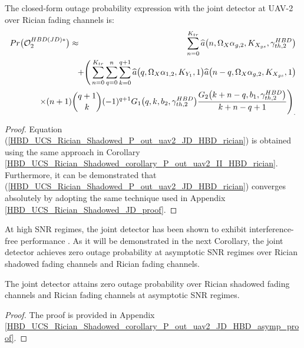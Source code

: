 \begin{corollary} \label{HBD_UCS_Rician_Shadowed_corollary_P_out_uav2_JD_HBD_rician}
The closed-form outage probability expression with the joint detector at UAV-2 over Rician fading channels is:
\begin{eqnarray} \label{HBD_UCS_Rician_Shadowed_P_out_uav2_JD_HBD_rician}
 Pr\big(\mathcal{O}_{2}^{HBD(JD)*}\big) & \approx & \sum_{n=0}^{K_{tr}} \widehat{a}\big(n,\Omega_X\alpha_{g,2},K_{X_{gs}},\gamma_{th,2}^{HBD}\big) \nonumber\\
 & & \hspace{-2cm} + \Bigg( \sum_{n=0}^{K_{tr}}\sum_{q=0}^{n}\sum_{k=0}^{q+1} \widehat{a}\big(q,\Omega_X\alpha_{1,2},K_{Y_1},1\big) \widehat{a}\big(n-q,\Omega_X\alpha_{g,2},K_{X_{gs}},1\big) \nonumber\\
 & & \hspace{-2cm} \times (n+1) \binom{q+1}{k}(-1)^{q+1} G_1\big(q,k,b_2,\gamma_{th,2}^{HBD}\big) \frac{G_2\big(k+n-q,b_1,\gamma_{th,2}^{HBD}\big)}{k+n-q+1}\Bigg)_.
\end{eqnarray}
\end{corollary}
\begin{proof}
Equation (\ref{HBD_UCS_Rician_Shadowed_P_out_uav2_JD_HBD_rician}) is obtained using the same approach in Corollary \ref{HBD_UCS_Rician_Shadowed_corollary_P_out_uav2_II_HBD_rician}. Furthermore, it can be demonstrated that (\ref{HBD_UCS_Rician_Shadowed_P_out_uav2_JD_HBD_rician}) converges absolutely by adopting the same technique used in Appendix \ref{HBD_UCS_Rician_Shadowed_JD_proof}.
\end{proof}

At high SNR regimes, the joint detector has been shown to exhibit interference-free performance \cite{tan2018joint}. As it will be demonstrated in the next Corollary, the joint detector achieves zero outage probability at asymptotic SNR regimes over Rician shadowed fading channels and Rician fading channels.

\begin{corollary} \label{HBD_UCS_Rician_Shadowed_corollary_P_out_uav2_JD_HBD_asymp}
The joint detector attains zero outage probability over Rician shadowed fading channels and Rician fading channels at asymptotic SNR regimes. 
\end{corollary}
\begin{proof}
The proof is provided in Appendix \ref{HBD_UCS_Rician_Shadowed_corollary_P_out_uav2_JD_HBD_asymp_proof}.
\end{proof}


